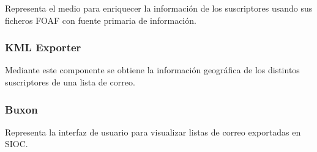 Representa el medio para enriquecer la información de los suscriptores
usando sus ficheros FOAF con fuente primaria de información.

\subsubsection{KML Exporter}

Mediante este componente se obtiene la información geográfica de los
distintos suscriptores de una lista de correo.

\subsubsection{Buxon}

Representa la interfaz de usuario para visualizar listas de correo
exportadas en SIOC.



